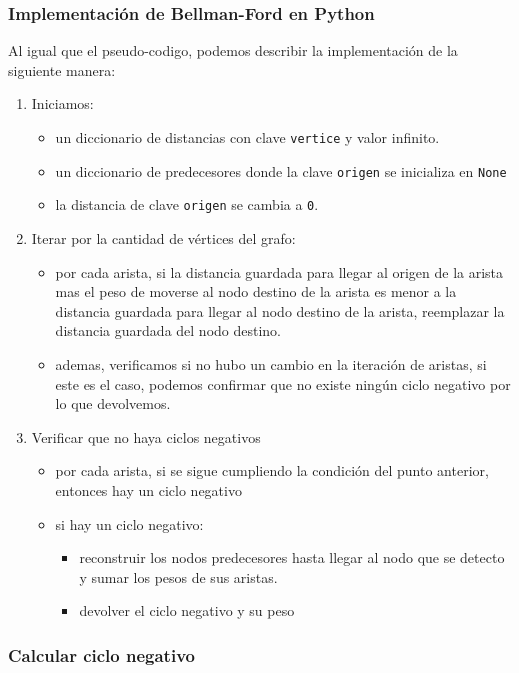 \documentclass[titlepage,a4paper]{article}
\begin{document}
\subsubsection{Implementación de Bellman-Ford en Python}
\label{sec:org22ad69e}

Al igual que el pseudo-codigo, podemos describir la implementación de la
siguiente manera:

\begin{enumerate}
\item Iniciamos:
\begin{itemize}
\item un diccionario de distancias con clave \texttt{vertice} y valor infinito.
\item un diccionario de predecesores donde la clave \texttt{origen} se inicializa en \texttt{None}
\item la distancia de clave \texttt{origen} se cambia a \texttt{0}.
\end{itemize}
\item Iterar por la cantidad de vértices del grafo:
\begin{itemize}
\item por cada arista, si la distancia guardada para llegar al origen de la
arista mas el peso de moverse al nodo destino de la arista es menor a la
distancia guardada para llegar al nodo destino de la arista, reemplazar la
distancia guardada del nodo destino.
\item ademas, verificamos si no hubo un cambio en la iteración de aristas, si
este es el caso, podemos confirmar que no existe ningún ciclo negativo
por lo que devolvemos.
\end{itemize}
\item Verificar que no haya ciclos negativos
\begin{itemize}
\item por cada arista, si se sigue cumpliendo la condición del punto anterior,
entonces hay un ciclo negativo
\item si hay un ciclo negativo:
\begin{itemize}
\item reconstruir los nodos predecesores hasta llegar al nodo que se detecto
y sumar los pesos de sus aristas.
\item devolver el ciclo negativo y su peso
\end{itemize}
\end{itemize}
\end{enumerate}

\subsubsection{Calcular ciclo negativo}
\label{sec:orgbb6cd68}
\end{document}
